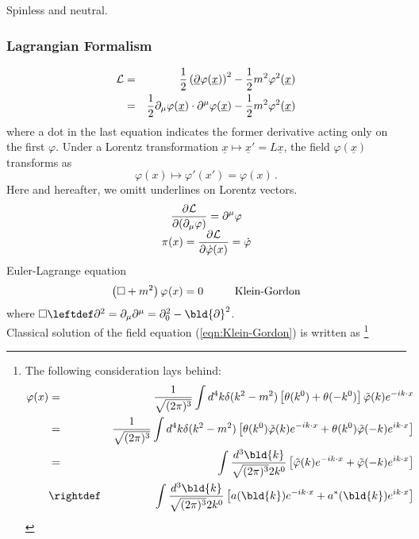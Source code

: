 Spinless and neutral.
\subsubsection{Lagrangian Formalism}
\begin{eqnarray}
{\cal L} &=& \frac{1}{2} 
\left( \underline{\partial} \varphi(\underline{x}) \right)^2
-\frac{1}{2} m^2 \varphi^2(\underline{x})
\nonumber\\
&=& \frac{1}{2} 
\partial_\mu \varphi(\underline{x})\cdot \partial^\mu \varphi(\underline{x})
-\frac{1}{2} m^2 \varphi^2(\underline{x})
\label{eqn:RSCLagrangiandensity}
\end{eqnarray}
where a dot in the last equation indicates the former derivative acting only on the first $\varphi$.
Under a Lorentz transformation $\underline{x} \mapsto \underline{x}' = L\underline{x}$,
the field $\varphi(\underline{x})$ transforms as
\begin{equation}
\varphi(x) \mapsto \varphi'(x') = \varphi(x)\,.
\end{equation}
Here and hereafter, we omitt underlines on Lorentz vectors.
\begin{equation}
\begin{array}{c}
\displaystyle
\frac{\partial {\cal L}}{\partial(\partial_\mu \varphi)} = \partial^\mu \varphi
\\
\displaystyle
\pi(x) = \frac{ \partial {\cal L}}{ \partial \dot{\varphi}(x) } = \dot{\varphi}
\end{array}
\label{eqn:conjmomentumRscalar}
\end{equation}
Euler-Lagrange equation
\begin{equation}
\left( \Box + m^2 \right) \varphi_{}(x) = 0
\hspace{10mm}
\mbox{Klein-Gordon}
\label{eqn:Klein-Gordon}
\end{equation}
where $\Box \leftdef \partial^2 = \partial_\mu \partial^\mu = \partial_0^2 - \bld{\partial}^2$.\\
Classical solution of the field equation (\ref{eqn:Klein-Gordon}) is written as
\footnote{%
The following consideration lays behind:
\begin{eqnarray*}
\varphi(x)
&=&
\frac{1}{\sqrt{(2\pi)^3}}
\int 
d^4 k
\delta(k^2 - m^2)
\left[
\theta(k^0) + \theta(-k^0)
\right]
\tilde{\varphi} (k)
e^{-i k \cdot x}
\nonumber\\
&=&
\frac{1}{\sqrt{(2\pi)^3}}
\int 
d^4 k
\delta(k^2 - m^2)
\left[
\theta(k^0)
\tilde{\varphi} (k)
e^{-i k \cdot x}
 + \theta(k^0)
\tilde{\varphi} (-k)
e^{i k \cdot x}
\right]
\nonumber\\
&=&
\int 
\frac{d^3 \bld{k}}{\sqrt{(2\pi)^3}2 k^0}
\left[
\tilde{\varphi} (k)
e^{-i k \cdot x}
 + 
\tilde{\varphi} (-k)
e^{i k \cdot x}
\right]
\nonumber\\
&\rightdef&
\int 
\frac{d^3 \bld{k}}{\sqrt{(2\pi)^3}2 k^0}
\left[
a (\bld{k})
e^{-i k \cdot x}
 +
 a^*(\bld{k}) 
e^{i k \cdot x}
\right]
\end{eqnarray*}
}%
